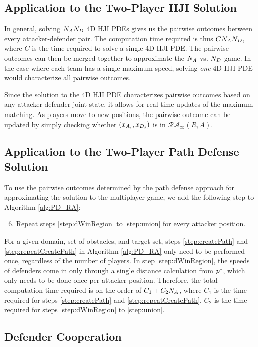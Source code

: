 \subsection{Application to the Two-Player HJI Solution}
\label{subusec:MMHJI}
In general, solving $N_AN_D$ 4D HJI PDEs gives us the pairwise outcomes between every attacker-defender pair. The computation time required is thus $C N_AN_D$, where $C$ is the time required to solve a single 4D HJI PDE. The pairwise outcomes can then be merged together to approximate the $N_A$ vs. $N_D$ game. In the case where each team has a single maximum speed, solving \textit{one} 4D HJI PDE would characterize all pairwise outcomes.

Since the solution to the 4D HJI PDE characterizes pairwise outcomes based on any attacker-defender joint-state, it allows for real-time updates of the maximum matching. As players move to new positions, the pairwise outcome can be updated by simply checking whether $(x_{A_{i}}, x_{D_{j}})$ is in $\mathcal{RA}_\infty(R,A)$.

\subsection{Application to the Two-Player Path Defense Solution}
\label{subsec:MMPD}
To use the pairwise outcomes determined by the path defense approach for approximating the solution to the multiplayer game, we add the following step to Algorithm \ref{alg:PD_RA}: 
\begin{enumerate}
\setcounter{enumi}{5}
\item Repeat steps \ref{step:dWinRegion} to \ref{step:union} for every attacker position.
\end{enumerate}

For a given domain, set of obstacles, and target set, steps \ref{step:createPath} and \ref{step:repeatCreatePath} in Algorithm \ref{alg:PD_RA} only need to be performed once, regardless of the number of players. In step \ref{step:dWinRegion}, the speeds of defenders come in only through a single distance calculation from $p^*$, which only needs to be done once per attacker position. Therefore, the total computation time required is on the order of $C_1 + C_2 N_A$, where $C_1$ is the time required for steps \ref{step:createPath} and \ref{step:repeatCreatePath}, $C_2$ is the time required for steps \ref{step:dWinRegion} to \ref{step:union}. 

\subsection{Defender Cooperation}
